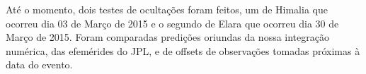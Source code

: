 \documentclass[12pt,a4paper]{report}
\begin{document}
Até o momento, dois testes de ocultações foram feitos, um de Himalia que ocorreu dia 03 de Março de 2015 e o segundo de Elara que ocorreu dia 30 de Março de 2015.
Foram comparadas predições oriundas da nossa integração numérica, das efemérides do JPL, e de offsets de observações tomadas próximas à data do evento.

\end{document}
